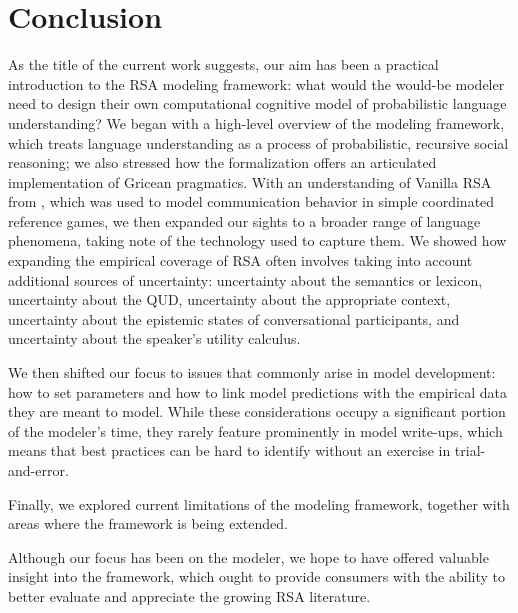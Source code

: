 \documentclass{sp}
\newcommand{\mf}[1]{\textcolor{orange}{[mf: #1]}}
\newcommand{\mht}[1]{\textcolor{purple}{[mht: #1]}}
\begin{document}


\section{Conclusion} \label{summary}

As the title of the current work suggests, our aim has been a practical introduction to the RSA modeling framework: what would the would-be modeler need to design their own computational cognitive model of probabilistic language understanding? We began with a high-level overview of the modeling framework, which treats language understanding as a process of probabilistic, recursive social reasoning; we also stressed how the formalization offers an articulated implementation of Gricean pragmatics. With an understanding of Vanilla RSA from \cite{frankgoodman2012}, which was used to model communication behavior in simple coordinated reference games, we then expanded our sights to a broader range of language phenomena, taking note of the technology used to capture them. We showed how expanding the empirical coverage of RSA often involves taking into account additional sources of uncertainty: uncertainty about the semantics or lexicon, uncertainty about the QUD, uncertainty about the appropriate context, uncertainty about the epistemic states of conversational participants, and uncertainty about the speaker's utility calculus.

We then shifted our focus to issues that commonly arise in model development: how to set parameters and how to link model predictions with the empirical data they are meant to model. While these considerations occupy a significant portion of the modeler's time, they rarely feature prominently in model write-ups, which means that best practices can be hard to identify without an exercise in trial-and-error.

Finally, we explored current limitations of the modeling framework, together with areas where the framework is being extended.

Although our focus has been on the modeler, we hope to have offered valuable insight into the framework, which ought to provide consumers with the ability to better evaluate and appreciate the growing RSA literature.
\end{document}
